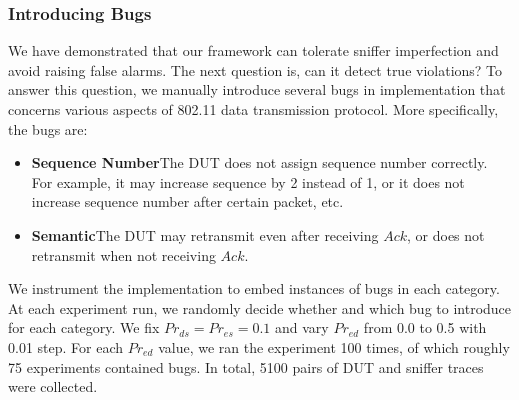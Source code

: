 \subsubsection{Introducing Bugs}

We have demonstrated that our framework can tolerate sniffer imperfection and
avoid raising false alarms.
%
The next question is, can it detect true violations?
%
To answer this question, we manually introduce several bugs in \ns{}
implementation that concerns various aspects of 802.11 data transmission
protocol.
%
More specifically, the bugs are:

\begin{itemize}
  \item \textbf{Sequence Number}\quad The DUT does not assign sequence number
    correctly. For example, it may increase sequence by 2 instead of 1, or it
    does not increase sequence number after certain packet, etc.
  \item \textbf{Semantic}\quad The DUT may retransmit even
    after receiving $Ack$, or does not retransmit when not receiving $Ack$.
\end{itemize}

We instrument the \ns{} implementation to embed instances of bugs in each
category. At each experiment run, we randomly decide whether and which bug to
introduce for each category. We fix $Pr_{ds}=Pr_{es}=0.1$ and vary $Pr_{ed}$
from 0.0 to 0.5 with 0.01 step. For each $Pr_{ed}$ value, we ran the experiment
100 times, of which roughly 75 experiments contained bugs. In total, 5100 pairs of
DUT and sniffer traces were collected.

